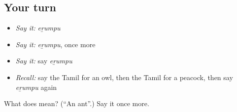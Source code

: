 \subsection*{Your turn}
\begin{itemize}
\raggedright
  \item \emph{Say it:} \emph{eṟumpu}
  \item \emph{Say it:} \emph{eṟumpu}, once more
  \item \emph{Say it:} say \emph{eṟumpu}
  \item \emph{Recall:} say the Tamil for an owl, then the Tamil for a peacock, then say \emph{eṟumpu} again
\end{itemize}

\begin{tcolorbox}[breakable,colback=teal!4,colframe=teal!35!black,title={Before you move on}]
What does  mean? (\textquotedblleft{}An ant\textquotedblright{}.) Say it once more.
\end{tcolorbox}
